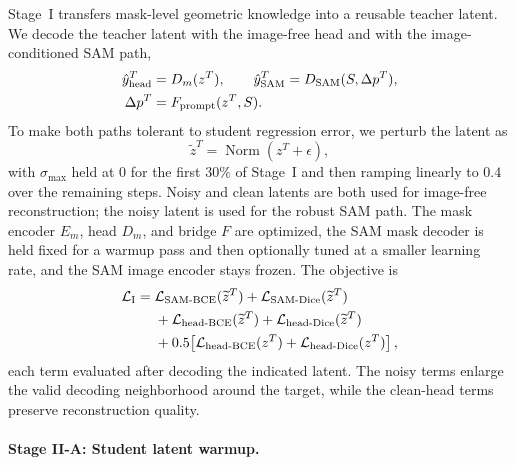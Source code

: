 Stage~I transfers mask-level geometric knowledge into a reusable teacher latent. We decode the teacher latent with the image-free head and with the image-conditioned SAM path,
\begin{align}
  \hat y^T_{\mathrm{head}}&=D_m(z^T), \qquad
  \hat y^T_{\mathrm{SAM}}=D_{\mathrm{SAM}}(S,\Delta p^T),\notag\\
  \Delta p^T&=F_{\mathrm{prompt}}(z^T,S).
  \label{eq:teacher_head}
\end{align}
To make both paths tolerant to student regression error, we perturb the latent as
\begin{equation}
  \widetilde z^T=\operatorname{Norm}(z^T+\epsilon),
  \label{eq:noisy_latent}
\end{equation}
with $\sigma_{\max}$ held at $0$ for the first $30\%$ of Stage~I and then ramping linearly to $0.4$ over the remaining steps. Noisy and clean latents are both used for image-free reconstruction; the noisy latent is used for the robust SAM path. The mask encoder $E_m$, head $D_m$, and bridge $F$ are optimized, the SAM mask decoder is held fixed for a warmup pass and then optionally tuned at a smaller learning rate, and the SAM image encoder stays frozen. The objective is
\begin{align}
  \mathcal{L}_{\mathrm{I}}={}&
  \mathcal{L}_{\mathrm{SAM\text{-}BCE}}(\widetilde z^T)
  +\mathcal{L}_{\mathrm{SAM\text{-}Dice}}(\widetilde z^T) \notag\\
  &+\mathcal{L}_{\mathrm{head\text{-}BCE}}(\widetilde z^T)
  +\mathcal{L}_{\mathrm{head\text{-}Dice}}(\widetilde z^T) \\
  &+0.5\!\left[\mathcal{L}_{\mathrm{head\text{-}BCE}}(z^T)
  +\mathcal{L}_{\mathrm{head\text{-}Dice}}(z^T)\right], \notag
  \label{eq:stage1_loss}
\end{align}
each term evaluated after decoding the indicated latent. The noisy terms enlarge the valid decoding neighborhood around the target, while the clean-head terms preserve reconstruction quality.

\paragraph{Stage II-A: Student latent warmup.}
\label{sec:stage2}

